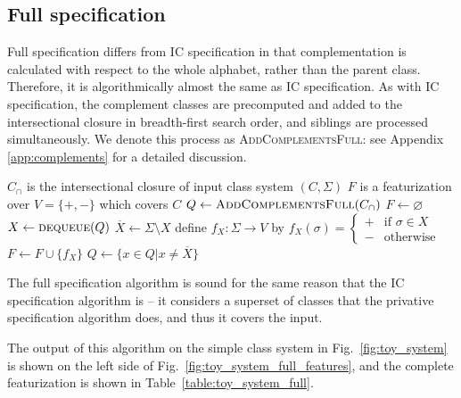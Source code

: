 \documentclass[12pt, oneside]{article}   	%
\begin{document}
\subsection{Full specification}
\label{sec:full}

Full specification differs from IC specification in that complementation is calculated with respect to the whole alphabet, rather than the parent class. Therefore, it is algorithmically almost the same as IC specification. As with IC specification, the complement classes are precomputed and added to the intersectional closure in breadth-first search order, and siblings are processed simultaneously. We denote this process as \textsc{AddComplementsFull}: see Appendix \ref{app:complements} for a detailed discussion.
\noindent \begin{algorithmic}
	\singlespacing
    \REQUIRE $C_\cap$ is the intersectional closure of input class system $(C, \Sigma)$
    \ENSURE $F$ is a featurization over $V = \{ +, - \}$ which covers $C$
    \STATE
    \STATE $Q \leftarrow \textsc{AddComplementsFull}(C_\cap)$
    \STATE $F \leftarrow \varnothing$
    \STATE
        \STATE $X \leftarrow \textsc{dequeue}(Q)$
	        \STATE $\overline{X} \leftarrow \Sigma \setminus X$
            \STATE define $f_X : \Sigma \rightarrow V$ by $f_X (\sigma) = \begin{cases}
                    + & \text{if } \sigma \in X \\
                    - & \text{otherwise}
                    \end{cases}$
            \STATE $F \leftarrow F \cup \{f_X\}$
            \STATE $Q \leftarrow \{x \in Q \vert x \neq \overline{X} \}$
        \ENDIF
    \ENDWHILE
\end{algorithmic}
\doublespacing

\noindent The full specification algorithm is sound for the same reason that the IC specification algorithm is -- it considers a superset of classes that the privative specification algorithm does, and thus it covers the input.

The output of this algorithm on the simple class system in Fig.~\ref{fig:toy_system} is shown on the left side of Fig.~\ref{fig:toy_system_full_features}, and the complete featurization is shown in Table~\ref{table:toy_system_full}. 
\end{document}
